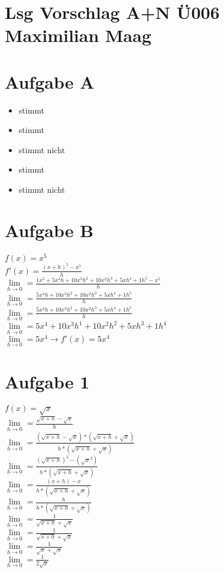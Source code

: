 \documentclass{article}
\begin{document}
	\section*{Lsg Vorschlag A+N Ü006 Maximilian Maag}
	\section*{Aufgabe A}
	\begin{itemize}
		\item stimmt
		\item stimmt
		\item stimmt nicht
		\item stimmt
		\item stimmt nicht 
	\end{itemize}
	\section*{Aufgabe B}
	$f(x) = x^5$ \\
	$f'(x) = \frac{(x + h)^5 - x^5}{h}$ \\
	$\lim\limits_{h \to 0}= \frac{1x^5 + 5x^4h + 10x^3h^2 + 10x^2h^3 + 5xh^4 + 1h^5 - x^5}{h}$ \\
	$\lim\limits_{h \to 0}= \frac{5x^4h + 10x^3h^2 + 10x^2h^3 + 5xh^4 + 1h^5}{h}$ \\
	$\lim\limits_{h \to 0}= \frac{5x^4h + 10x^3h^2 + 10x^2h^3 + 5xh^4 + 1h^5}{h}$ \\
	$\lim\limits_{h \to 0}= 5x^4 + 10x^3h^1 + 10x^2h^2 + 5xh^3 + 1h^4$ \\
	$\lim\limits_{h \to 0}= 5x^4 \to f'(x) = 5x^4$
	\section*{Aufgabe 1}
	$f(x) = \sqrt{x}$ \\
	$\lim\limits_{h \to 0} = \frac{\sqrt{x+h} - \sqrt{x}}{h}$ \\
	$\lim\limits_{h \to 0} = \frac{(\sqrt{x+h} - \sqrt{x}) * (\sqrt{x + h} + \sqrt{x})}{h * (\sqrt{x + h} + \sqrt{x})}$ \\
	$\lim\limits_{h \to 0} = \frac{(\sqrt{x + h})^2 - (\sqrt{x}^2)}{h * (\sqrt{x + h} + \sqrt{x})}$ \\
	$\lim\limits_{h \to 0} = \frac{(x + h) - x}{h * (\sqrt{x + h} + \sqrt{x})}$ \\
	$\lim\limits_{h \to 0} = \frac{h}{h * (\sqrt{x + h} + \sqrt{x})}$ \\
	$\lim\limits_{h \to 0} = \frac{1}{ \sqrt{x + h} + \sqrt{x}}$ \\
	$\lim\limits_{h \to 0} = \frac{1}{ \sqrt{x + 0} + \sqrt{x}}$ \\
	$\lim\limits_{h \to 0} = \frac{1}{ \sqrt{x} + \sqrt{x}}$ \\
	$\lim\limits_{h \to 0} = \frac{1}{2\sqrt{x}}$ \\
\end{document}
